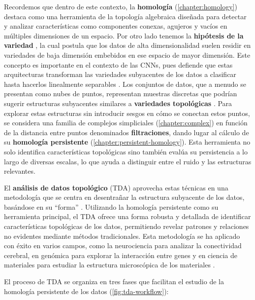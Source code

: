 Recordemos que dentro de este contexto, la \textbf{homología} (\autoref{chapter:homology})
destaca como una herramienta de la topología algebraica diseñada para detectar y
analizar características como componentes conexas, agujeros y vacíos en
múltiples dimensiones de un espacio. Por otro lado tenemos la \textbf{hipótesis
	de la variedad} \cite{fefferman2013testingmanifoldhypothesis}, la cual postula que
los datos de alta dimensionalidad suelen residir en variedades de baja dimensión
embebidos en ese espacio de mayor dimensión. Este concepto es importante en el
contexto de las CNNs, pues defiende que estas arquitecturas transforman las variedades
subyacentes de los datos a clasificar hasta hacerlos linealmente separables \cite{cohen2020separability}.
Los conjuntos de datos, que a menudo se presentan como nubes de puntos,
representan muestras discretas que podrían sugerir estructuras subyacentes
similares a \textbf{variedades topológicas} \cite{magai2023deep}. Para explorar
estas estructuras sin introducir sesgos en cómo se conectan estos puntos, se considera
una familia de complejos simpliciales (\autoref{chapter:complex}) en función de la
distancia entre puntos denominados \textbf{filtraciones}, dando lugar al cálculo
de su \textbf{homología persistente} (\autoref{chapter:persistent-homology}). Esta
herramienta no solo identifica características topológicas sino también evalúa su
persistencia a lo largo de diversas escalas, lo que ayuda a distinguir entre el
ruido y las estructuras relevantes.

El \textbf{análisis de datos topológico} (TDA) aprovecha estas técnicas en una metodología
que se centra en desentrañar la estructura subyacente de los datos, basándose en
su \enquote{forma} \cite{carlsson2009topology}. Utilizando la homología
persistente como su herramienta principal, el TDA ofrece una forma robusta y detallada
de identificar características topológicas de los datos, permitiendo revelar
patrones y relaciones no evidentes mediante métodos tradicionales. Esta metodología
se ha aplicado con éxito en varios campos, como la neurociencia para analizar la
conectividad cerebral, en genómica para explorar la interacción entre genes y en
ciencia de materiales para estudiar la estructura microscópica de los materiales
\cite{10.3389/frai.2021.667963}.

El proceso de TDA se organiza en tres fases que facilitan el estudio de la homología
persistente de los datos (\autoref{fig:tda-workflow}):

